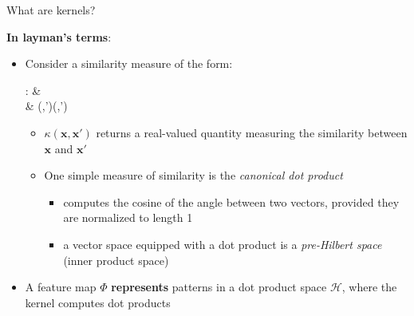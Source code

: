 \documentclass[aspectratio=169,xcolor=dvipsnames,svgnames,x11names,fleqn]{beamer}
\begin{document}
\begin{frame}{What are kernels?}

    {\bf\color{MediumRed}In layman's terms}: 
    \begin{itemize}
        
        \item<3-> Consider a similarity measure of the form:
            \begin{multiequation}
            \kappa: & \times{}\rightarrow{}\nonumber\\
                & (,')\mapsto \kappa(,')
            \end{multiequation}

        \begin{itemize}
            \item<4-> $\kappa(\mathbf{x},\mathbf{x}')$ returns a real-valued quantity measuring the similarity 
                between $\mathbf{x}$ and $\mathbf{x}'$
            \item<5-> One simple measure of similarity is the {\textrm{\em canonical dot product}}
                \begin{itemize}
                \item<5-> computes the cosine of the angle between two vectors, provided they are normalized
                    to length 1
                \item<5-> a vector space equipped with a dot product is a {\textrm{\em pre-Hilbert space}} (inner product space)
                \end{itemize}
            \end{itemize}
            
        \item<6-> A feature map $\Phi$ {\bf\color{MediumRed}represents} patterns in a dot product space $\mathcal{H}$, where the kernel computes dot products  
        
    \end{itemize}
\end{frame}
\end{document}
